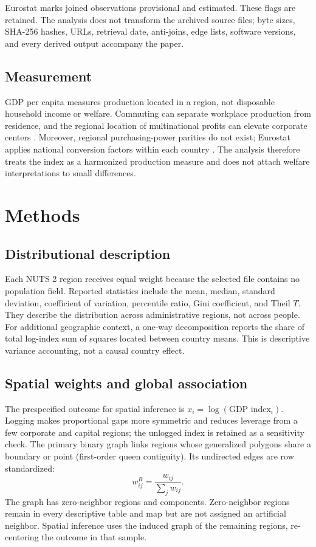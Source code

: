 \documentclass[11pt,a4paper]{article}
\begin{document}
Eurostat marks \NProvisional{} joined observations provisional and
\NEstimated{} estimated. These flags are retained. The analysis does not
transform the archived source files; byte sizes, SHA-256 hashes, URLs,
retrieval date, anti-joins, edge lists, software versions, and every derived
output accompany the paper.

\subsection{Measurement}

GDP per capita measures production located in a region, not disposable
household income or welfare. Commuting can separate workplace production from
residence, and the regional location of multinational profits can elevate
corporate centers \citep{eurostat2025regionalgdp}. Moreover, regional
purchasing-power parities do not exist; Eurostat applies national conversion
factors within each country
\citep{eurostat2026metadata}. The analysis therefore treats the index as a
harmonized production measure and does not attach welfare interpretations to
small differences.

\section{Methods}

\subsection{Distributional description}

Each NUTS 2 region receives equal weight because the selected file contains no
population field. Reported statistics include the mean, median, standard
deviation, coefficient of variation, percentile ratio, Gini coefficient, and
Theil $T$. They describe the distribution across administrative regions, not
across people. For additional geographic context, a one-way decomposition
reports the share of total log-index sum of squares located between country
means. This is descriptive variance accounting, not a causal country effect.

\subsection{Spatial weights and global association}

The prespecified outcome for spatial inference is
$x_i=\log(\text{GDP index}_i)$. Logging makes proportional gaps more symmetric
and reduces leverage from a few corporate and capital regions; the unlogged
index is retained as a sensitivity check. The primary binary graph links
regions whose generalized polygons share a boundary or point (first-order
queen contiguity). Its \QueenEdges{} undirected edges are row standardized:
\[
  w_{ij}^{R}=\frac{w_{ij}}{\sum_j w_{ij}}.
\]
The graph has \QueenIsolates{} zero-neighbor regions and \QueenComponents{}
components. Zero-neighbor regions remain in every descriptive table and map
but are not assigned an artificial neighbor. Spatial inference uses the
induced graph of the remaining \MoranN{} regions, re-centering the outcome in
that sample.
\end{document}
